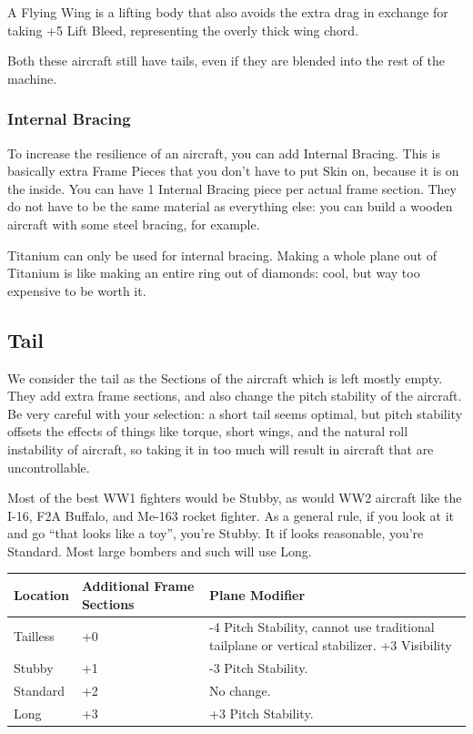 \documentclass{article}
\begin{document}
A Flying Wing is a lifting body that also avoids the extra drag
in exchange for taking +5 Lift Bleed, representing the overly thick wing
chord.

Both these aircraft still have tails, even if they are blended
into the rest of the machine.

\subsubsection{Internal Bracing}
\label{_Internal Bracing}

To increase the resilience of an aircraft, you can add Internal Bracing.
This is basically extra Frame Pieces that you don't have to put Skin on,
because it is on the inside. You can have 1 Internal Bracing piece per
actual frame section. They do not have to be the same material as
everything else: you can build a wooden aircraft with some steel
bracing, for example.

Titanium can only be used for internal bracing. Making a whole plane out
of Titanium is like making an entire ring out of diamonds: cool, but way
too expensive to be worth it.

\subsection{Tail}
\label{_Tail}

We consider the tail as the Sections of the aircraft which is left
mostly empty. They add extra frame sections, and also change the pitch
stability of the aircraft. Be very careful with your selection: a short
tail seems optimal, but pitch stability offsets the effects of things
like torque, short wings, and the natural roll instability of aircraft,
so taking it in too much will result in aircraft that are
uncontrollable.

Most of the best WW1 fighters would be Stubby, as would WW2 aircraft
like the I-16, F2A Buffalo, and Me-163 rocket fighter. As a general
rule, if you look at it and go ``that looks like a toy'', you're Stubby.
It if looks reasonable, you're Standard. Most large bombers and such
will use Long.

\begin{tabular}{|l|l|l|}
    \hline
    Location & Additional Frame Sections & Plane Modifier                                          \\\hline
    Tailless & +0                        & -4 Pitch Stability, cannot use traditional tailplane or
    vertical stabilizer. +3 Visibility                                                             \\\hline
    Stubby   & +1                        & -3 Pitch Stability.                                     \\\hline
    Standard & +2                        & No change.                                              \\\hline
    Long     & +3                        & +3 Pitch Stability.                                     \\\hline
\end{tabular}
\end{document}
